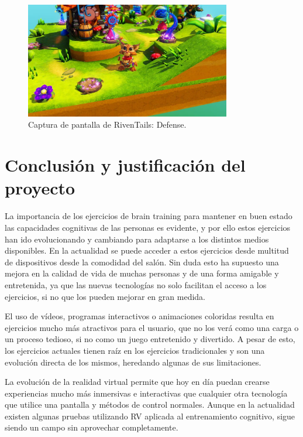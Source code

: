 \begin{figure}[H]
  \centering
\includegraphics[width=0.8\textwidth]{03.EstudioProblema/01.EstadoArte/00.Figuras/33.riventails_defense.jpg}
    \caption{Captura de pantalla de RivenTails: Defense. \cite{EA_img_rivenTails}}
    \label{fig:EA_rivenTails}
\end{figure}




\section{Conclusión y justificación del proyecto}


La importancia de los ejercicios de brain training para mantener en buen estado las capacidades cognitivas de las personas es evidente, y por ello estos ejercicios han ido evolucionando y cambiando para adaptarse a los distintos medios disponibles. En la actualidad se puede acceder a estos ejercicios desde multitud de dispositivos desde la comodidad del salón. Sin duda esto ha supuesto una mejora en la calidad de vida de muchas personas y de una forma amigable y entretenida, ya que las nuevas tecnologías no solo facilitan el acceso a los ejercicios, si no que los pueden mejorar en gran medida. 

El uso de vídeos, programas interactivos o animaciones coloridas resulta en ejercicios mucho más atractivos para el usuario, que no los verá como una carga o un proceso tedioso, si no como un juego entretenido y divertido. A pesar de esto, los ejercicios actuales tienen raíz en los ejercicios tradicionales y son una evolución directa de los mismos, heredando algunas de sus limitaciones. 

La evolución de la realidad virtual permite que hoy en día puedan crearse experiencias mucho más inmersivas e interactivas que cualquier otra tecnología que utilice una pantalla y métodos de control normales. Aunque en la actualidad existen algunas pruebas utilizando RV aplicada al entrenamiento cognitivo, sigue siendo un campo sin aprovechar completamente.

